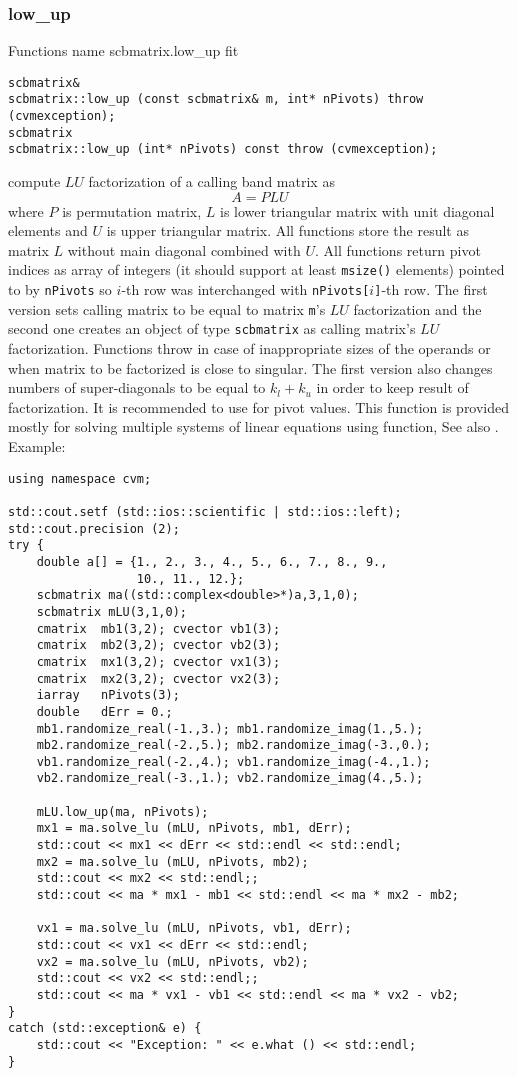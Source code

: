 \subsubsection{low\_up}
Functions%
\pdfdest name {scbmatrix.low_up} fit
\begin{verbatim}
scbmatrix& 
scbmatrix::low_up (const scbmatrix& m, int* nPivots) throw (cvmexception);
scbmatrix
scbmatrix::low_up (int* nPivots) const throw (cvmexception);
\end{verbatim}
compute  $LU$ factorization of a calling band matrix as
\begin{equation*}
A=PLU
\end{equation*}
where $P$ is  permutation matrix, $L$ is  lower
triangular matrix with unit diagonal
elements and $U$ is  upper triangular matrix.
All  functions store the result as  matrix $L$ without
main diagonal combined with $U$. All  functions
return pivot indices as  array of integers
(it should support at least \verb"msize()" elements)
pointed to by \verb"nPivots" so \hbox{$i$-th} row
was interchanged with \hbox{\verb"nPivots["$i$\verb"]"-th} row.
The first version sets  calling matrix to be equal to matrix
\verb"m"'s $LU$ factorization and the second one
creates an object of type \verb"scbmatrix" as calling matrix's
$LU$ factorization.
Functions throw 
in case of inappropriate
sizes of the operands or when  matrix to be factorized is close to
singular. 
The first version also changes numbers of 
super-diagonals to be equal to $k_l+k_u$
in order to keep  result of factorization.
It is recommended to use 
for pivot values.
This function is provided mostly for solving multiple
systems of linear equations using 
 function,
See also
.
Example:
\begin{Verbatim}
using namespace cvm;

std::cout.setf (std::ios::scientific | std::ios::left); 
std::cout.precision (2);
try {
    double a[] = {1., 2., 3., 4., 5., 6., 7., 8., 9.,
                  10., 11., 12.};
    scbmatrix ma((std::complex<double>*)a,3,1,0);
    scbmatrix mLU(3,1,0);
    cmatrix  mb1(3,2); cvector vb1(3);
    cmatrix  mb2(3,2); cvector vb2(3);
    cmatrix  mx1(3,2); cvector vx1(3);
    cmatrix  mx2(3,2); cvector vx2(3);
    iarray   nPivots(3);
    double   dErr = 0.;
    mb1.randomize_real(-1.,3.); mb1.randomize_imag(1.,5.);
    mb2.randomize_real(-2.,5.); mb2.randomize_imag(-3.,0.);
    vb1.randomize_real(-2.,4.); vb1.randomize_imag(-4.,1.);
    vb2.randomize_real(-3.,1.); vb2.randomize_imag(4.,5.);

    mLU.low_up(ma, nPivots);
    mx1 = ma.solve_lu (mLU, nPivots, mb1, dErr);
    std::cout << mx1 << dErr << std::endl << std::endl;
    mx2 = ma.solve_lu (mLU, nPivots, mb2);
    std::cout << mx2 << std::endl;;
    std::cout << ma * mx1 - mb1 << std::endl << ma * mx2 - mb2;

    vx1 = ma.solve_lu (mLU, nPivots, vb1, dErr);
    std::cout << vx1 << dErr << std::endl;
    vx2 = ma.solve_lu (mLU, nPivots, vb2);
    std::cout << vx2 << std::endl;;
    std::cout << ma * vx1 - vb1 << std::endl << ma * vx2 - vb2;
}
catch (std::exception& e) {
    std::cout << "Exception: " << e.what () << std::endl;
}
\end{Verbatim}
